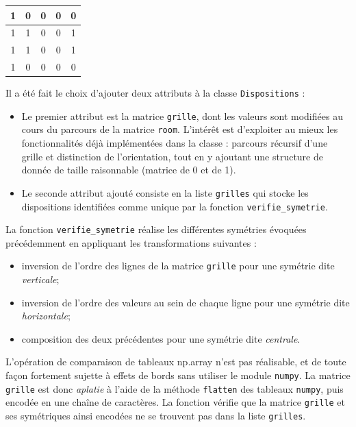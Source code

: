 \begin{multicols}{2}
\begin{center}
        \begin{tabular}{|c |c |c |c |c |} \hline
        \cellcolor{tsyellow}1 & \cellcolor{tsforestgreen}0 & \cellcolor{tsforestgreen}0 & \cellcolor{tsforestgreen}0 & \cellcolor{tsforestgreen}0 \\ \hline
        \cellcolor{tsyellow}1 & \cellcolor{tsyellow}1      & \cellcolor{tsforestgreen}0 & \cellcolor{tsforestgreen}0 & \cellcolor{tsyellow}1      \\ \hline
        \cellcolor{tsyellow}1 & \cellcolor{tsyellow}1      & \cellcolor{tsforestgreen}0 & \cellcolor{tsforestgreen}0 & \cellcolor{tsyellow}1      \\ \hline
        \cellcolor{tsyellow}1 & \cellcolor{tsforestgreen}0 & \cellcolor{tsforestgreen}0 & \cellcolor{tsforestgreen}0 & \cellcolor{tsforestgreen}0 \\ \hline
    \end{tabular}
    \end{center}

\end{multicols}

Il a été fait le choix d'ajouter deux attributs à la classe \texttt{Dispositions} :
\begin{itemize}
    \item Le premier attribut est la matrice \texttt{grille}, dont les valeurs sont modifiées au cours du 
    parcours de la matrice \texttt{room}. L'intérêt est d'exploiter au mieux les fonctionnalités déjà implémentées 
    dans la classe : parcours récursif d'une grille et distinction de l'orientation, tout en y ajoutant une 
    structure de donnée de taille raisonnable (matrice de 0 et de 1).
    \item Le seconde attribut ajouté consiste en la liste \texttt{grilles} qui stocke les dispositions
    identifiées comme unique par la fonction \texttt{verifie\_symetrie}.
\end{itemize} 

La fonction \texttt{verifie\_symetrie} réalise les différentes symétries évoquées précédemment en appliquant
les transformations suivantes :
\begin{itemize}
    \item inversion de l'ordre des lignes de la matrice \texttt{grille} pour une symétrie dite \emph{verticale};
    \item inversion de l'ordre des valeurs au sein de chaque ligne pour une symétrie dite \emph{horizontale};
    \item composition des deux précédentes pour une symétrie dite \emph{centrale}.
\end{itemize}
L'opération de comparaison de tableaux np.array n'est pas réalisable, et de toute façon fortement sujette
à effets de bords sans utiliser le module \texttt{numpy}. La matrice \texttt{grille} est donc \emph{aplatie} à
l'aide de la méthode \texttt{flatten} des tableaux \texttt{numpy}, puis encodée en une chaîne de caractères.
La fonction vérifie que la matrice \texttt{grille} et ses symétriques ainsi encodées ne se trouvent pas dans 
la liste \texttt{grilles}.\\

